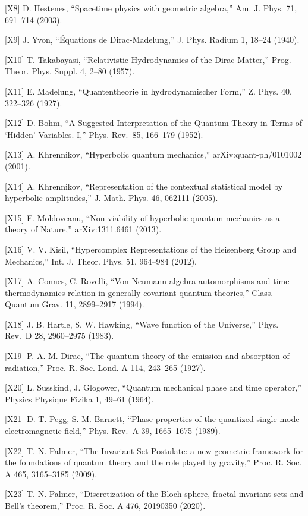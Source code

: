 \documentclass[
  a4paper,
]{ltjsarticle}
\begin{document}
{[}X8{]} D. Hestenes, ``Spacetime physics with geometric algebra,'' Am.
J. Phys. 71, 691--714 (2003).

{[}X9{]} J. Yvon, ``Équations de Dirac-Madelung,'' J. Phys. Radium 1,
18--24 (1940).

{[}X10{]} T. Takabayasi, ``Relativistic Hydrodynamics of the Dirac
Matter,'' Prog. Theor. Phys. Suppl. 4, 2--80 (1957).

{[}X11{]} E. Madelung, ``Quantentheorie in hydrodynamischer Form,'' Z.
Phys. 40, 322--326 (1927).

{[}X12{]} D. Bohm, ``A Suggested Interpretation of the Quantum Theory in
Terms of `Hidden' Variables. I,'' Phys. Rev.~85, 166--179 (1952).

{[}X13{]} A. Khrennikov, ``Hyperbolic quantum mechanics,''
arXiv:quant-ph/0101002 (2001).

{[}X14{]} A. Khrennikov, ``Representation of the contextual statistical
model by hyperbolic amplitudes,'' J. Math. Phys. 46, 062111 (2005).

{[}X15{]} F. Moldoveanu, ``Non viability of hyperbolic quantum mechanics
as a theory of Nature,'' arXiv:1311.6461 (2013).

{[}X16{]} V. V. Kisil, ``Hypercomplex Representations of the Heisenberg
Group and Mechanics,'' Int. J. Theor. Phys. 51, 964--984 (2012).

{[}X17{]} A. Connes, C. Rovelli, ``Von Neumann algebra automorphisms and
time-thermodynamics relation in generally covariant quantum theories,''
Class. Quantum Grav. 11, 2899--2917 (1994).

{[}X18{]} J. B. Hartle, S. W. Hawking, ``Wave function of the
Universe,'' Phys. Rev.~D 28, 2960--2975 (1983).

{[}X19{]} P. A. M. Dirac, ``The quantum theory of the emission and
absorption of radiation,'' Proc. R. Soc. Lond. A 114, 243--265 (1927).

{[}X20{]} L. Susskind, J. Glogower, ``Quantum mechanical phase and time
operator,'' Physics Physique Fizika 1, 49--61 (1964).

{[}X21{]} D. T. Pegg, S. M. Barnett, ``Phase properties of the quantized
single-mode electromagnetic field,'' Phys. Rev.~A 39, 1665--1675 (1989).

{[}X22{]} T. N. Palmer, ``The Invariant Set Postulate: a new geometric
framework for the foundations of quantum theory and the role played by
gravity,'' Proc. R. Soc. A 465, 3165--3185 (2009).

{[}X23{]} T. N. Palmer, ``Discretization of the Bloch sphere, fractal
invariant sets and Bell's theorem,'' Proc. R. Soc. A 476, 20190350
(2020).
\end{document}
